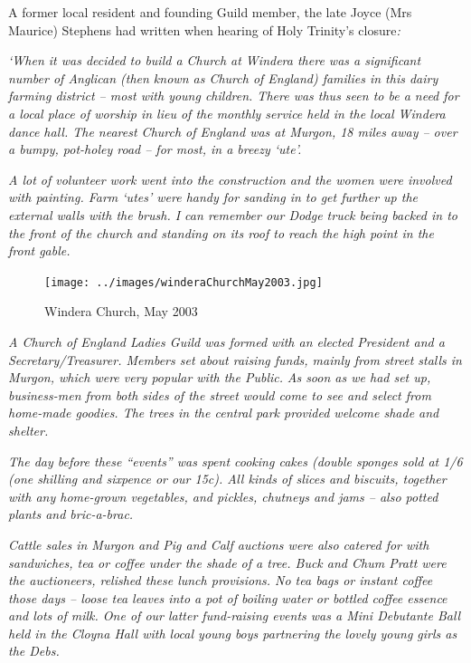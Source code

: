 A former local resident and founding Guild member, the late Joyce (Mrs Maurice) Stephens had written when hearing of Holy Trinity's closure\emph{:}



\emph{`When it was decided to build a Church at Windera there was a significant number of Anglican (then known as Church of England) families in this dairy farming district -- most with young children. There was thus seen to be a need for a local place of worship in lieu of the monthly service held in the local Windera dance hall. The nearest Church of England was at Murgon, 18 miles away -- over a bumpy, pot-holey road -- for most, in a breezy `ute'.}



\emph{A lot of volunteer work went into the construction and the women were involved with painting. Farm `utes' were handy for sanding in to get further up the external walls with the brush. I can remember our Dodge truck being backed in to the front of the church and standing on its roof to reach the high point in the front gable.}









\begin{figure}[!htb]
\begin{center}
\texttt{[image: ../images/winderaChurchMay2003.jpg]}
\caption{Windera Church, May 2003}
\end{center}
\end{figure}




\emph{A Church of England Ladies Guild was formed with an elected President and a Secretary/Treasurer. Members set about raising funds, mainly from street stalls in Murgon, which were very popular with the Public.} \emph{As soon as we had set up, business-men from both sides of the street would come to see and select from home-made goodies. The trees in the central park provided welcome shade and shelter.}



\emph{The day before these ``events'' was spent cooking cakes (double sponges sold at 1/6 (one shilling and sixpence or our 15c). All kinds of slices and biscuits, together with any home-grown vegetables, and pickles, chutneys and jams -- also potted plants and bric-a-brac.}



\emph{Cattle sales in Murgon and Pig and Calf auctions were also catered for with sandwiches, tea or coffee under the shade of a tree. Buck and Chum Pratt were the auctioneers, relished these lunch provisions. No tea bags or instant coffee those days -- loose tea leaves into a pot of boiling water or bottled coffee essence and lots of milk. One of our latter fund-raising events was a Mini Debutante Ball held in the Cloyna Hall with local young boys partnering the lovely young girls as the Debs.}




